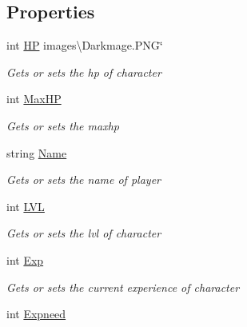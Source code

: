 \subsection*{Properties}
\begin{DoxyCompactItemize}
\item 
int \hyperlink{class_lightdeath_1_1_character__classes_a9881180d8ff6f85d1ec3109b719fc48c}{HP} images\textbackslash{}\+Darkmage.\+P\+NG\char`\"{}
\begin{DoxyCompactList}\small\item\em Gets or sets the hp of character \end{DoxyCompactList}\item 
int \hyperlink{class_lightdeath_1_1_character__classes_acd36193ea83be482c414822fc2fe47e3}{Max\+HP}
\begin{DoxyCompactList}\small\item\em Gets or sets the maxhp \end{DoxyCompactList}\item 
string \hyperlink{class_lightdeath_1_1_character__classes_a7d0d9e96297782253c9f7b22276a1b3b}{Name}
\begin{DoxyCompactList}\small\item\em Gets or sets the name of player \end{DoxyCompactList}\item 
int \hyperlink{class_lightdeath_1_1_character__classes_aedb9c7cf2519076a0e507ca69608a617}{L\+VL}
\begin{DoxyCompactList}\small\item\em Gets or sets the lvl of character \end{DoxyCompactList}\item 
int \hyperlink{class_lightdeath_1_1_character__classes_a1d2eac71218ba80909899ad9badf523e}{Exp}
\begin{DoxyCompactList}\small\item\em Gets or sets the current experience of character \end{DoxyCompactList}\item 
int \hyperlink{class_lightdeath_1_1_character__classes_acdb5c8b66a8a4f7a9f17cf4dc4839a80}{Expneed}

\end{DoxyCompactItemize}
